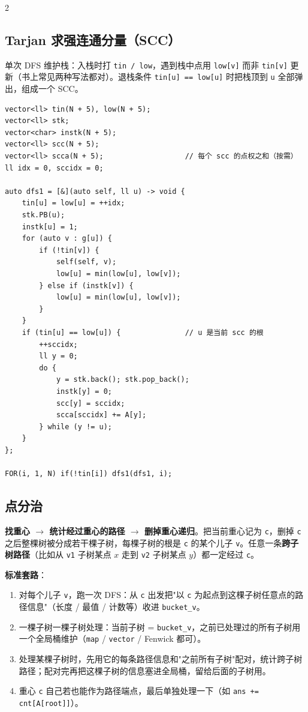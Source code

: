 \begin{multicols*}{2}
		\subsection{Tarjan 求强连通分量（SCC）}

		单次 DFS 维护栈：入栈时打 \texttt{tin / low}，遇到栈中点用 \texttt{low[v]} 而非 \texttt{tin[v]} 更新（书上常见两种写法都对）。退栈条件 \texttt{tin[u] == low[u]} 时把栈顶到 \texttt{u} 全部弹出，组成一个 SCC。

		\begin{verbatim}
vector<ll> tin(N + 5), low(N + 5);
vector<ll> stk;
vector<char> instk(N + 5);
vector<ll> scc(N + 5);
vector<ll> scca(N + 5);                   // 每个 scc 的点权之和（按需）
ll idx = 0, sccidx = 0;

auto dfs1 = [&](auto self, ll u) -> void {
    tin[u] = low[u] = ++idx;
    stk.PB(u);
    instk[u] = 1;
    for (auto v : g[u]) {
        if (!tin[v]) {
            self(self, v);
            low[u] = min(low[u], low[v]);
        } else if (instk[v]) {
            low[u] = min(low[u], low[v]);
        }
    }
    if (tin[u] == low[u]) {               // u 是当前 scc 的根
        ++sccidx;
        ll y = 0;
        do {
            y = stk.back(); stk.pop_back();
            instk[y] = 0;
            scc[y] = sccidx;
            scca[sccidx] += A[y];
        } while (y != u);
    }
};

FOR(i, 1, N) if(!tin[i]) dfs1(dfs1, i);
		\end{verbatim}


		\subsection{点分治}

		\textbf{找重心 $\to$ 统计经过重心的路径 $\to$ 删掉重心递归}。把当前重心记为 \texttt{c}，删掉 \texttt{c} 之后整棵树被分成若干棵子树，每棵子树的根是 \texttt{c} 的某个儿子 \texttt{v}。任意一条\textbf{跨子树路径}（比如从 \texttt{v1} 子树某点 $x$ 走到 \texttt{v2} 子树某点 $y$）都一定经过 \texttt{c}。

		\textbf{标准套路}：

		\begin{enumerate}
			\item 对每个儿子 \texttt{v}，跑一次 DFS：从 \texttt{c} 出发把"以 \texttt{c} 为起点到这棵子树任意点的路径信息"（长度 / 最值 / 计数等）收进 \texttt{bucket\_v}。
			\item 一棵子树一棵子树处理：当前子树 = \texttt{bucket\_v}，之前已处理过的所有子树用一个全局桶维护（\texttt{map} / \texttt{vector} / Fenwick 都可）。
			\item 处理某棵子树时，先用它的每条路径信息和"之前所有子树"配对，统计跨子树路径；配对完再把这棵子树的信息塞进全局桶，留给后面的子树用。
			\item 重心 \texttt{c} 自己若也能作为路径端点，最后单独处理一下（如 \texttt{ans += cnt[A[root]]}）。
		\end{enumerate}


\end{multicols*}
